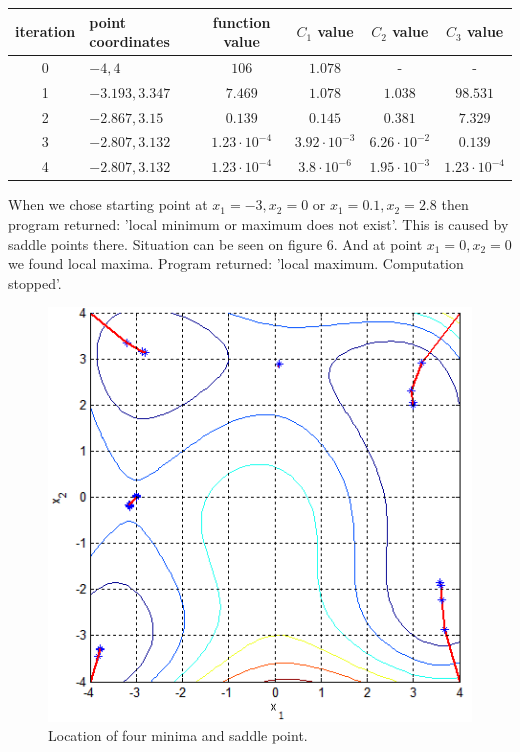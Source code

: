 \documentclass[12pt]{article}
\begin{document}
\begin{table}[H]
	\begin{tabularx}{\textwidth}{c|X|c|c|c|c|}
		iteration & point coordinates & function value & $C_1$ value & $C_2$ value & $C_3$ value\\
		\hline
		0 & $-4, 4$ & $106$ & $1.078$ & - & - \\
		\hline
		1 & $-3.193, 3.347$ & $7.469$ & $1.078$ & $1.038$ & $98.531$ \\
		\hline
		2 & $-2.867, 3.15$ & $0.139$ & $0.145$ & $0.381$ & $7.329$ \\
		\hline
		3 & $-2.807, 3.132$ & $1.23\cdot10^{-4}$ & $3.92\cdot10^{-3}$ & $6.26\cdot10^{-2}$ & $0.139$ \\
		\hline
		4 & $-2.807, 3.132$ & $1.23\cdot10^{-4}$ & $3.8\cdot10^{-6}$ & $1.95\cdot10^{-3}$ & $1.23\cdot10^{-4}$ \\ 
		\hline
	\end{tabularx}	
\end{table}	
When we chose starting point at $x_1=-3, x_2=0$ or $x_1=0.1, x_2=2.8$ then program returned: 'local minimum or maximum does not exist'. This is caused by saddle points there. Situation can be seen on figure 6. And at point $x_1=0, x_2=0$ we found local maxima. Program returned: 'local maximum. Computation stopped'. 
\begin{figure}[H]
	\begin{center}
		\includegraphics[width=16cm]{himm_results.png}
		\caption{Location of four minima and saddle point.}
	\end{center}
\end{figure} 
\end{document}
